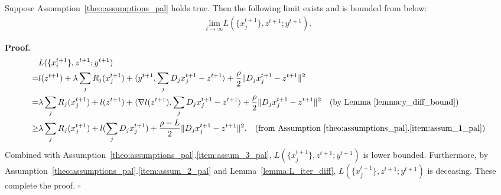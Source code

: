 \begin{lemma}\label{lemma:L_lower_bound}
    Suppose Assumption~\ref{theo:assumptions_pal} holds true. Then the following limit exists and is bounded from below: 
    \begin{align}
        \underset{t\rightarrow\infty}{\text{lim}} L(\{x_j^{t+1}\}, z^{t+1}; y^{t+1}). 
    \end{align}
\end{lemma}
{\bf Proof.} 
\begin{align}
    & L(\{x_i^{t+1}\}, z^{t+1}; y^{t+1} )\nonumber\\
    = & l(z^{t+1}) + \lambda\sum_j R_j(x_j^{t+1}) + \langle y^{t+1}, \sum_jD_j x_j^{t+1} - z^{t+1}\rangle + \frac{\rho}{2}\|D_j x_j^{t+1} - z^{t+1}\|^2\nonumber\\
    = &\lambda\sum_j R_j(x_j^{t+1}) + l(z^{t+1}) + \langle \nabla l(z^{t+1}), \sum_jD_j x_j^{t+1} - z^{t+1}\rangle + \frac{\rho}{2}\|D_j x_j^{t+1} - z^{t+1}\|^2\quad\text{(by Lemma~\ref{lemma:y_diff_bound})}\nonumber\\
    \ge & \lambda\sum_j R_j(x_j^{t+1}) + l(\sum_jD_j x_j^{t+1}) + \frac{\rho-L}{2}\|D_j x_j^{t+1} - z^{t+1}\|^2.\quad\text{(from Assumption~\ref{theo:assumptions_pal}.\ref{item:assum_1_pal})}
\end{align}
Combined with Assumption~\ref{theo:assumptions_pal}.\ref{item:assum_3_pal}, $L(\{x_j^{t+1}\}, z^{t+1}; y^{t+1})$ is lower bounded. Furthermore, by Assumption~\ref{theo:assumptions_pal}.\ref{item:assum_2_pal} and Lemma~\ref{lemma:L_iter_diff}, $L(\{x_j^{t+1}\}, z^{t+1}; y^{t+1})$ is deceasing. These complete the proof. \hfill$\square$

